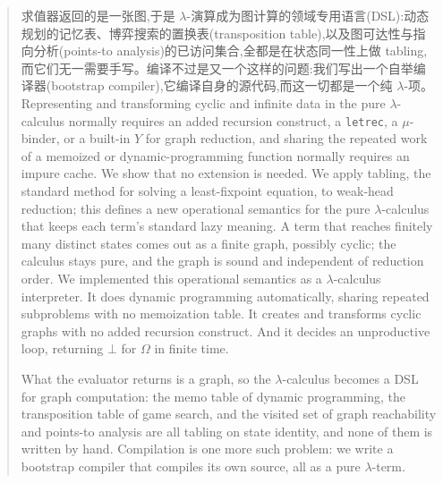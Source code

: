 \begin{CJK*}{UTF8}{gbsn}
\begin{abstract}
    求值器返回的是一张图,于是 $\lambda$-演算成为图计算的领域专用语言(DSL):动态规划的记忆表、博弈搜索的置换表(transposition table),以及图可达性与指向分析(points-to analysis)的已访问集合,全都是在状态同一性上做 tabling,而它们无一需要手写。编译不过是又一个这样的问题:我们写出一个自举编译器(bootstrap compiler),它编译自身的源代码,而这一切都是一个纯 $\lambda$-项。
    \else
    Representing and transforming cyclic and infinite data in the pure $\lambda$-calculus normally requires an added recursion construct, a \texttt{letrec}, a $\mu$-binder, or a built-in $Y$ for graph reduction, and sharing the repeated work of a memoized or dynamic-programming function normally requires an impure cache. We show that no extension is needed. We apply tabling, the standard method for solving a least-fixpoint equation, to weak-head reduction; this defines a new operational semantics for the pure $\lambda$-calculus that keeps each term's standard lazy meaning. A term that reaches finitely many distinct states comes out as a finite graph, possibly cyclic; the calculus stays pure, and the graph is sound and independent of reduction order. %
    We implemented this operational semantics as a $\lambda$-calculus interpreter. It does dynamic programming automatically, sharing repeated subproblems with no memoization table. It creates and transforms cyclic graphs with no added recursion construct. And it decides an unproductive loop, returning $\bot$ for $\Omega$ in finite time.

    What the evaluator returns is a graph, so the $\lambda$-calculus becomes a DSL for graph computation: the memo table of dynamic programming, the transposition table of game search, and the visited set of graph reachability and points-to analysis are all tabling on state identity, and none of them is written by hand. Compilation is one more such problem: we write a bootstrap compiler that compiles its own source, all as a pure $\lambda$-term.
    \fi
  \end{abstract}

  \fi %


\end{CJK*}
